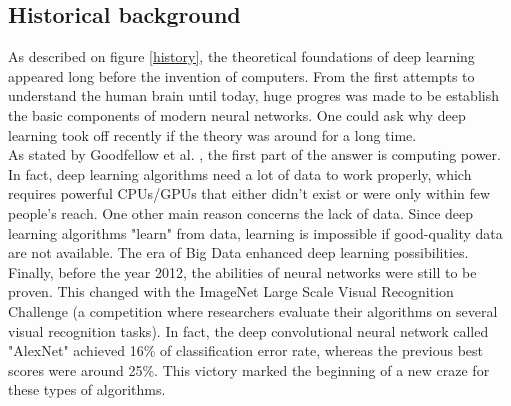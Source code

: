 \subsection{Historical background}
\label{historical_background}
As described on figure \ref{history}, the theoretical foundations of deep learning appeared long before the invention of computers. From the first attempts to understand the human brain until today, huge progres was made to be establish the basic components of modern neural networks. One could ask why deep learning took off recently if the theory was around for a long time.\\
As stated by Goodfellow et al. \cite{15}, the first part of the answer is computing power. In fact, deep learning algorithms need a lot of data to work properly, which requires powerful CPUs/GPUs that either didn't exist or were only within few people's reach. One other main reason concerns the lack of data. Since deep learning algorithms "learn" from data, learning is impossible if good-quality data are not available. The era of Big Data enhanced deep learning possibilities. 
Finally, before the year 2012, the abilities of neural networks were still to be proven. This changed with the ImageNet Large Scale Visual Recognition Challenge (a competition where researchers evaluate their algorithms on several visual recognition tasks). In fact, the deep convolutional neural network called "AlexNet" achieved 16\% of classification error rate, whereas the previous best scores were around 25\%. This victory marked the beginning of a new craze for these types of algorithms.


